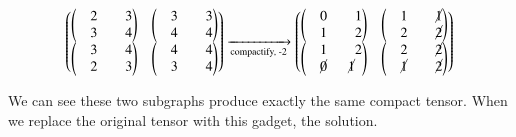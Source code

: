 \documentclass[review,onefignum,onetabnum]{siamart190516}
\newcommand{\<}{\langle}
\renewcommand{\>}{\rangle}
\begin{document}
\begin{align}
    \left(\begin{matrix}
        \left(\begin{matrix}
            ~~~~2 & ~~~~3\\
            ~~~~3 & ~~~~4
        \end{matrix}\right) &
        \left(\begin{matrix}
            ~~~~3 & ~~~~3\\
            ~~~~4 & ~~~~4
        \end{matrix}\right) \\
        \left(\begin{matrix}
            ~~~~3 & ~~~~4\\
            ~~~~2 & ~~~~3
        \end{matrix}\right) &
        \left(\begin{matrix}
            ~~~~4 & ~~~~4\\
            ~~~~3 & ~~~~4
        \end{matrix}\right)
    \end{matrix}\right)
    \xrightarrow[\text{compactify, -2}]{}
    \left(\begin{matrix}
        \left(\begin{matrix}
            ~~~~0 & ~~~~1\\
            ~~~~1 & ~~~~2
        \end{matrix}\right) &
        \left(\begin{matrix}
            ~~~~1 & ~~~~\cancel{1}\\
            ~~~~2 & ~~~~\cancel{2}
        \end{matrix}\right) \\
        \left(\begin{matrix}
            ~~~~1 & ~~~~2\\
            ~~~~\cancel{0} & \cancel{1}
        \end{matrix}\right) &
        \left(\begin{matrix}
            ~~~~2 & ~~~~\cancel{2}\\
            ~~~~\cancel{1} & ~~~~\cancel{2}
        \end{matrix}\right)
    \end{matrix}\right)
\end{align}

We can see these two subgraphs produce exactly the same compact tensor.
When we replace the original tensor with this gadget, the solution.
\end{document}
